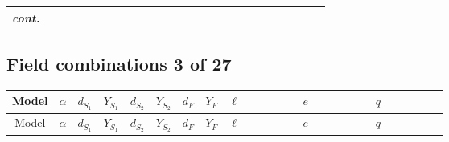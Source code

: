 \documentclass[8pt]{article}
\begin{document}
\begin{landscape}
\begin{longtable}{@{}cccccccc >{\raggedright\arraybackslash}p{0.21\linewidth} >{\raggedright\arraybackslash}p{0.21\linewidth} >{\raggedright\arraybackslash}p{0.21\linewidth}@{}}
\textit{cont.} &  &  &  &  &  &  &  &  & \scriptsize\adjustbox{max width=\linewidth}{$\begin{gathered} +\frac{\hbar  \log \left(\frac{\bar{\mu}^{2}}{m_1^2}\right) \overline{y_{1,i_1,r_1}} \overline{y_{2,i_2,r_2}} F_{r_1}{}^T\, C\, P_L\, F_{r_2} F_{r_4}{}^T\, C\, P_R\, F_{r_3} y_{1,i_2,r_3} y_{2,i_1,r_4}}{m_1^2}\end{gathered}$} &  \\
\midrule
\bottomrule
\end{longtable}
\clearpage
\subsection*{Field combinations 3 of 27}
\begin{longtable}{@{}cccccccc >{\raggedright\arraybackslash}p{0.21\linewidth} >{\raggedright\arraybackslash}p{0.21\linewidth} >{\raggedright\arraybackslash}p{0.21\linewidth}@{}}
\toprule
Model & $\alpha$ & $d_{S_1}$ & $Y_{S_1}$ & $d_{S_2}$ & $Y_{S_2}$ & $d_F$ & $Y_F$ & $\ell$ & $e$ & $q$ \\
\midrule
\endfirsthead
\toprule
Model & $\alpha$ & $d_{S_1}$ & $Y_{S_1}$ & $d_{S_2}$ & $Y_{S_2}$ & $d_F$ & $Y_F$ & $\ell$ & $e$ & $q$ \\
\midrule
\endhead

\end{longtable}
\end{landscape}
\end{document}
